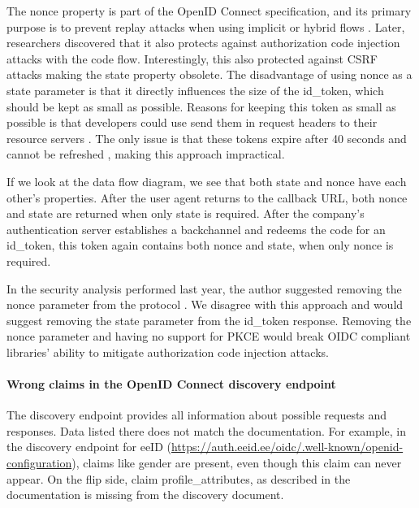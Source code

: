The nonce property is part of the OpenID Connect specification, and its primary purpose is to prevent replay attacks when using implicit or hybrid flows \cite{oidc}. Later, researchers discovered that it also protects against authorization code injection attacks with the code flow. Interestingly, this also protected against CSRF attacks making the state property obsolete. The disadvantage of using {nonce} as a state parameter is that it directly influences the size of the id\_token, which should be kept as small as possible. Reasons for keeping this token as small as possible is that developers could use send them in request headers to their resource servers \cite{rfc7519}. The only issue is that these tokens expire after 40 seconds and cannot be refreshed \cite{tara-technical}, making this approach impractical.

If we look at the data flow diagram, we see that both state and nonce have each other's properties. After the user agent returns to the callback URL, both {nonce} and {state} are returned when only {state} is required. After the company's authentication server establishes a backchannel and redeems the code for an id\_token, this token again contains both {nonce} and {state}, when only {nonce} is required.

In the security analysis performed last year, the author suggested removing the nonce parameter from the protocol \cite{tara-security-arnis}. We disagree with this approach and would suggest removing the state parameter from the id\_token response. Removing the nonce parameter and having no support for PKCE would break OIDC compliant libraries' ability to mitigate authorization code injection attacks.

\paragraph{Wrong claims in the OpenID Connect discovery endpoint} The discovery endpoint provides all information about possible requests and responses. Data listed there does not match the documentation. For example, in the discovery endpoint for eeID (\url{https://auth.eeid.ee/oidc/.well-known/openid-configuration}), claims like gender are present, even though this claim can never appear. On the flip side, claim profile\_attributes, as described in the documentation is missing from the discovery document.

